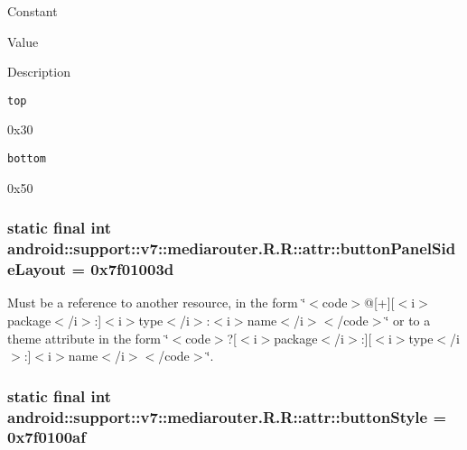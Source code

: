 Constant

Value

Description 

{\tt top}

0x30

{\tt bottom}

0x50\hypertarget{classandroid_1_1support_1_1v7_1_1mediarouter_1_1_r_1_1attr_0f9b4e5c32c2d22a9bfab61694360ecd}{
\subsubsection[{buttonPanelSideLayout}]{\setlength{\rightskip}{0pt plus 5cm}static final int android::support::v7::mediarouter.R.R::attr::buttonPanelSideLayout = 0x7f01003d}}
\label{classandroid_1_1support_1_1v7_1_1mediarouter_1_1_r_1_1attr_0f9b4e5c32c2d22a9bfab61694360ecd}


Must be a reference to another resource, in the form \char`\"{}$<$code$>$@\mbox{[}+\mbox{]}\mbox{[}$<$i$>$package$<$/i$>$:\mbox{]}$<$i$>$type$<$/i$>$:$<$i$>$name$<$/i$>$$<$/code$>$\char`\"{} or to a theme attribute in the form \char`\"{}$<$code$>$?\mbox{[}$<$i$>$package$<$/i$>$:\mbox{]}\mbox{[}$<$i$>$type$<$/i$>$:\mbox{]}$<$i$>$name$<$/i$>$$<$/code$>$\char`\"{}. \hypertarget{classandroid_1_1support_1_1v7_1_1mediarouter_1_1_r_1_1attr_9ecfd025d4c7fa1ca861da301ae5d3bd}{
\subsubsection[{buttonStyle}]{\setlength{\rightskip}{0pt plus 5cm}static final int android::support::v7::mediarouter.R.R::attr::buttonStyle = 0x7f0100af}}
\label{classandroid_1_1support_1_1v7_1_1mediarouter_1_1_r_1_1attr_9ecfd025d4c7fa1ca861da301ae5d3bd}


